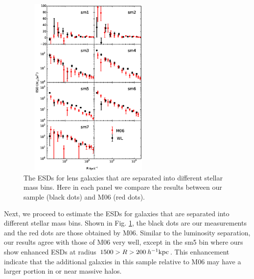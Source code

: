 \documentclass[apj]{emulateapj}
\newcommand{\kpch}{\>h^{-1}{\rm {kpc}}}
\begin{document}
\begin{figure}
\centering
\includegraphics[width=7cm,height=9cm]{f8.eps}
\caption{The ESDs for lens galaxies that are separated into different
  stellar mass bins. Here in each panel we compare the results between
  our sample (black dots) and M06 (red dots). }
  \label{fig:compare_sm}
\end{figure}



Next, we proceed to estimate the ESDs for galaxies that are separated
into different stellar mass bins. Shown in Fig. \ref{fig:compare_sm},
the black dots are our measurements and the red dots are those
obtained by M06. Similar to the luminosity separation, our results
agree with those of M06 very well, except in the sm5 bin where ours
show enhanced ESDs at radius $1500 > R > 200 \kpch$. This enhancement
indicate that the additional galaxies in this sample relative to M06
may have a larger portion in or near massive halos.



\end{document}
